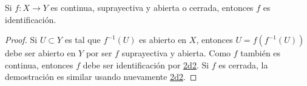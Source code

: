 

\begin{proposition}
Si $f : X \longrightarrow Y$ es continua, suprayectiva y abierta o cerrada, entonces $f$ es identificación.
\end{proposition}

\begin{proof}
Si $U \subset Y$ es tal que $f^{-1}(U)$ es abierto en $X$, entonces $U = f(f^{-1}(U))$ debe ser abierto en $Y$ por ser $f$ suprayectiva y abierta. Como $f$ también es continua, entonces $f$ debe ser identificación por \hyperref[card:2d2]{\textsf{2d2}}. Si $f$ es cerrada, la demostración es similar usando nuevamente \hyperref[card:2d2]{\textsf{2d2}}.

\end{proof}
